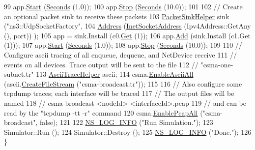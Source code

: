 \begin{DoxyCode}
99   app.\hyperlink{classns3_1_1ApplicationContainer_a8eff87926507020bbe3e1390358a54a7}{Start} (\hyperlink{group__timecivil_ga33c34b816f8ff6628e33d5c8e9713b9e}{Seconds} (1.0));
100   app.\hyperlink{classns3_1_1ApplicationContainer_adfc52f9aa4020c8714679b00bbb9ddb3}{Stop} (\hyperlink{group__timecivil_ga33c34b816f8ff6628e33d5c8e9713b9e}{Seconds} (10.0));
101 
102   \textcolor{comment}{// Create an optional packet sink to receive these packets}
103   \hyperlink{classns3_1_1PacketSinkHelper}{PacketSinkHelper} sink (\textcolor{stringliteral}{"ns3::UdpSocketFactory"},
104                          \hyperlink{classns3_1_1Address}{Address} (\hyperlink{classns3_1_1InetSocketAddress}{InetSocketAddress} (Ipv4Address::GetAny (), port))
      );
105   app = sink.Install (c0.\hyperlink{classns3_1_1NodeContainer_a9ed96e2ecc22e0f5a3d4842eb9bf90bf}{Get} (1));
106   app.\hyperlink{classns3_1_1ApplicationContainer_ad09ab1a1ad5849d518d5f4c262e38152}{Add} (sink.Install (c1.Get (1)));
107   app.\hyperlink{classns3_1_1ApplicationContainer_a8eff87926507020bbe3e1390358a54a7}{Start} (\hyperlink{group__timecivil_ga33c34b816f8ff6628e33d5c8e9713b9e}{Seconds} (1.0));
108   app.\hyperlink{classns3_1_1ApplicationContainer_adfc52f9aa4020c8714679b00bbb9ddb3}{Stop} (\hyperlink{group__timecivil_ga33c34b816f8ff6628e33d5c8e9713b9e}{Seconds} (10.0));
109 
110   \textcolor{comment}{// Configure ascii tracing of all enqueue, dequeue, and NetDevice receive }
111   \textcolor{comment}{// events on all devices.  Trace output will be sent to the file }
112   \textcolor{comment}{// "csma-one-subnet.tr"}
113   \hyperlink{classns3_1_1AsciiTraceHelper}{AsciiTraceHelper} ascii;
114   csma.\hyperlink{classns3_1_1AsciiTraceHelperForDevice_a63e57c878526c732924e14c1e52cca8b}{EnableAsciiAll} (ascii.\hyperlink{classns3_1_1AsciiTraceHelper_a44960bf2ca32835024eaedd26d1c4f94}{CreateFileStream} (\textcolor{stringliteral}{"csma-broadcast.tr"}));
115 
116   \textcolor{comment}{// Also configure some tcpdump traces; each interface will be traced}
117   \textcolor{comment}{// The output files will be named }
118   \textcolor{comment}{// csma-broadcast-<nodeId>-<interfaceId>.pcap}
119   \textcolor{comment}{// and can be read by the "tcpdump -tt -r" command }
120   csma.\hyperlink{classns3_1_1PcapHelperForDevice_a4ab183a2512120200d4a0e5d8ececd49}{EnablePcapAll} (\textcolor{stringliteral}{"csma-broadcast"}, \textcolor{keyword}{false});
121 
122   \hyperlink{group__logging_gafbd73ee2cf9f26b319f49086d8e860fb}{NS\_LOG\_INFO} (\textcolor{stringliteral}{"Run Simulation."});
123   Simulator::Run ();
124   Simulator::Destroy ();
125   \hyperlink{group__logging_gafbd73ee2cf9f26b319f49086d8e860fb}{NS\_LOG\_INFO} (\textcolor{stringliteral}{"Done."});
126 \}
\end{DoxyCode}


